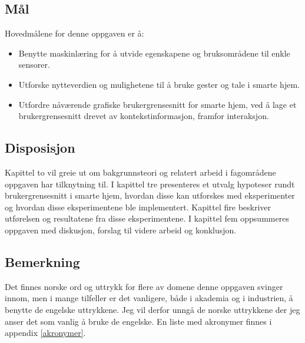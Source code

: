\subsection*{Mål}
Hovedmålene for denne oppgaven er å:
\begin{itemize}
\item Benytte maskinlæring for å utvide egenskapene og bruksområdene til enkle sensorer.
\item Utforske nytteverdien og mulighetene til å bruke gester og tale i smarte hjem. 
\item Utfordre nåværende grafiske brukergrensesnitt for smarte hjem, ved å lage et brukergrensesnitt drevet av kontekstinformasjon, framfor interaksjon.
\end{itemize}

\subsection*{Disposisjon}
Kapittel to vil greie ut om bakgrunnsteori og relatert arbeid i fagområdene oppgaven har tilknytning til. I kapittel tre presenteres et utvalg hypoteser rundt brukergrensesnitt i smarte hjem, hvordan disse kan utforskes med eksperimenter og hvordan disse eksperimentene ble implementert. Kapittel fire beskriver utførelsen og resultatene fra disse eksperimentene. I kapittel fem oppsummeres oppgaven med diskusjon, forslag til videre arbeid og konklusjon.

\subsection*{Bemerkning}
Det finnes norske ord og uttrykk for flere av domene denne oppgaven svinger innom, men i mange tilfeller er det vanligere, både i akademia og i industrien, å benytte de engelske uttrykkene. Jeg vil derfor unngå de norske uttrykkene der jeg anser det som vanlig å bruke de engelske. En liste med akronymer finnes i appendix \ref{akronymer}.